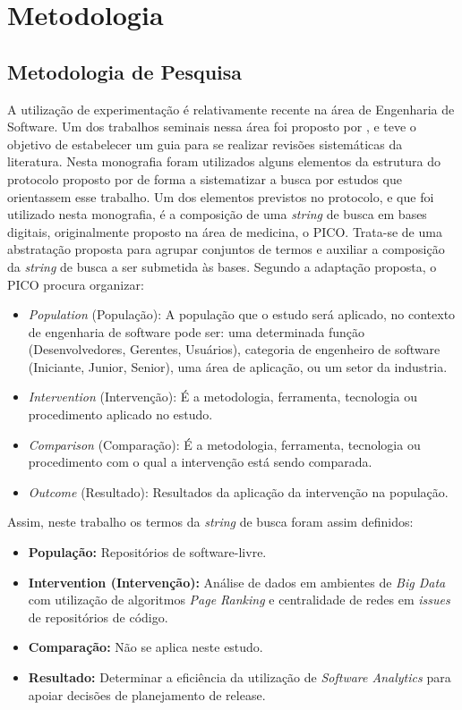 \chapter{Metodologia}
\label{met}
\section{Metodologia de Pesquisa}
\label{met:pes}

A utilização de experimentação é relativamente recente na área de Engenharia de Software. Um dos trabalhos seminais nessa área foi proposto por , e teve o objetivo de estabelecer um guia para se realizar revisões sistemáticas da literatura. Nesta monografia foram utilizados alguns elementos da estrutura do protocolo proposto por  de forma a sistematizar a busca por estudos que orientassem esse trabalho. Um dos elementos previstos no protocolo, e que foi utilizado nesta monografia, é a composição de uma \textit{string} de busca em bases digitais, originalmente proposto na área de medicina, o PICO. \cite{citeulike:10757239} Trata-se de uma abstratação proposta para agrupar conjuntos de termos e auxiliar a composição da \textit{string} de busca a ser submetida às bases. Segundo a adaptação proposta, o PICO procura organizar:

\begin{itemize}
    \item \textit{Population} (População): A população que o estudo será aplicado, no contexto de engenharia de software pode ser: uma determinada função (Desenvolvedores, Gerentes, Usuários), categoria de engenheiro de software (Iniciante, Junior, Senior), uma área de aplicação, ou um setor da industria.
    \item \textit{Intervention} (Intervenção): É a metodologia, ferramenta, tecnologia ou procedimento aplicado no estudo.
    \item \textit{Comparison} (Comparação): É a metodologia, ferramenta, tecnologia ou procedimento com o qual a intervenção está sendo comparada.
    \item \textit{Outcome} (Resultado): Resultados da aplicação da intervenção na população.
\end{itemize}

Assim, neste trabalho os termos da \textit{string} de busca foram assim definidos:

\begin{itemize}
    \item \textbf{População:} Repositórios de software-livre.
    \item \textbf{Intervention (Intervenção):} Análise de dados em ambientes de \textit{Big Data} com utilização de algoritmos \textit{Page Ranking} e centralidade de redes em \textit{issues} de repositórios de código.
    \item \textbf{Comparação:} Não se aplica neste estudo.
    \item \textbf{Resultado:} Determinar a eficiência da utilização de \textit{Software Analytics} para apoiar decisões de planejamento de release.
\end{itemize}


